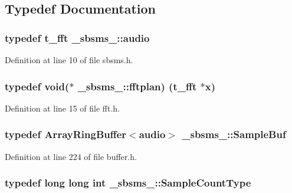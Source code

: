 \subsection{Typedef Documentation}
\subsubsection[{\texorpdfstring{audio}{audio}}]{\setlength{\rightskip}{0pt plus 5cm}typedef {\bf t\+\_\+fft} {\bf \+\_\+sbsms\+\_\+\+::audio}}\hypertarget{namespace__sbsms___a11786cc5bd221ff534972ae350477324}{}\label{namespace__sbsms___a11786cc5bd221ff534972ae350477324}


Definition at line 10 of file sbsms.\+h.

\subsubsection[{\texorpdfstring{fftplan}{fftplan}}]{\setlength{\rightskip}{0pt plus 5cm}typedef {\bf void}($\ast$ \+\_\+sbsms\+\_\+\+::fftplan) ({\bf t\+\_\+fft} $\ast$x)}\hypertarget{namespace__sbsms___a7f1d3311b2efc8799b5c4bf22942e197}{}\label{namespace__sbsms___a7f1d3311b2efc8799b5c4bf22942e197}


Definition at line 15 of file fft.\+h.

\subsubsection[{\texorpdfstring{Sample\+Buf}{SampleBuf}}]{\setlength{\rightskip}{0pt plus 5cm}typedef {\bf Array\+Ring\+Buffer}$<${\bf audio}$>$ {\bf \+\_\+sbsms\+\_\+\+::\+Sample\+Buf}}\hypertarget{namespace__sbsms___a8cd0992a16c2cc5448b63d446239c196}{}\label{namespace__sbsms___a8cd0992a16c2cc5448b63d446239c196}


Definition at line 224 of file buffer.\+h.

\subsubsection[{\texorpdfstring{Sample\+Count\+Type}{SampleCountType}}]{\setlength{\rightskip}{0pt plus 5cm}typedef long long {\bf int} {\bf \+\_\+sbsms\+\_\+\+::\+Sample\+Count\+Type}}\hypertarget{namespace__sbsms___ae4ba47977e7e07f5945e529e2256b662}{}\label{namespace__sbsms___ae4ba47977e7e07f5945e529e2256b662}


